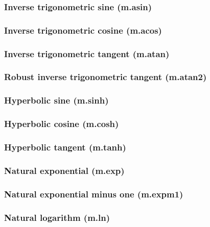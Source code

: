 \documentclass{article}
\theoremstyle{definition}
\begin{document}
\subsubsection{Inverse trigonometric sine (m.asin)}

\subsubsection{Inverse trigonometric cosine (m.acos)}

\subsubsection{Inverse trigonometric tangent (m.atan)}

\subsubsection{Robust inverse trigonometric tangent (m.atan2)}

\subsubsection{Hyperbolic sine (m.sinh)}

\subsubsection{Hyperbolic cosine (m.cosh)}

\subsubsection{Hyperbolic tangent (m.tanh)}

\subsubsection{Natural exponential (m.exp)}

\subsubsection{Natural exponential minus one (m.expm1)}

\subsubsection{Natural logarithm (m.ln)}
\end{document}
